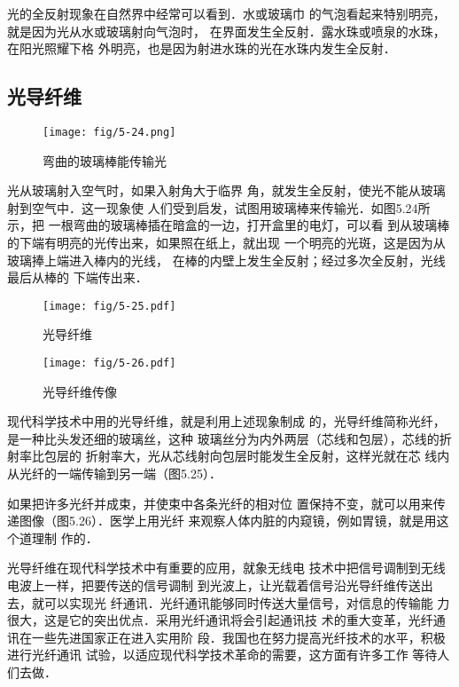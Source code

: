 光的全反射现象在自然界中经常可以看到．水或玻璃巾
的气泡看起来特别明亮，就是因为光从水或玻璃射向气泡时，
在界面发生全反射．露水珠或喷泉的水珠，在阳光照耀下格
外明亮，也是因为射进水珠的光在水珠内发生全反射．

\subsection{光导纤维}
\begin{figure}[htp]\centering
    \texttt{[image: fig/5-24.png]}
    \caption{弯曲的玻璃棒能传输光}
    \end{figure}

光从玻璃射入空气时，如果入射角大于临界
角，就发生全反射，使光不能从玻璃射到空气中．这一现象使
人们受到启发，试图用玻璃棒来传输光．如图5.24所示，把
一根弯曲的玻璃棒插在暗盒的一边，打开盒里的电灯，可以看
到从玻璃棒的下端有明亮的光传出来，如果照在纸上，就出现
一个明亮的光斑，这是因为从玻璃捧上端进入棒内的光线，
在棒的内壁上发生全反射；经过多次全反射，光线最后从棒的
下端传出来．
\begin{figure}[htp]\centering
	\begin{minipage}[t]{0.48\textwidth}
		\centering
    \texttt{[image: fig/5-25.pdf]}
\caption{光导纤维}
	\end{minipage}
	\begin{minipage}[t]{0.48\textwidth}
		\centering
    \texttt{[image: fig/5-26.pdf]}
\caption{光导纤维传像}
	\end{minipage}
\end{figure}

现代科学技术中用的光导纤维，就是利用上述现象制成
的，光导纤维简称光纤，是一种比头发还细的玻璃丝，这种
玻璃丝分为内外两层（芯线和包层），芯线的折射率比包层的
折射率大，光从芯线射向包层时能发生全反射，这样光就在芯
线内从光纤的一端传输到另一端（图5.25）．


如果把许多光纤并成束，并使束中各条光纤的相对位
置保持不变，就可以用来传递图像（图5.26）．医学上用光纤
来观察人体内脏的内窥镜，例如胃镜，就是用这个道理制
作的．

光导纤维在现代科学技术中有重要的应用，就象无线电
技术中把信号调制到无线电波上一样，把要传送的信号调制
到光波上，让光载着信号沿光导纤维传送出去，就可以实现光
纤通讯．光纤通讯能够同时传送大量信号，对信息的传输能
力很大，这是它的突出优点．采用光纤通讯将会引起通讯技
术的重大变革，光纤通讯在一些先进国家正在进入实用阶
段．我国也在努力提高光纤技术的水平，积极进行光纤通讯
试验，以适应现代科学技术革命的需要，这方面有许多工作
等待人们去做．

